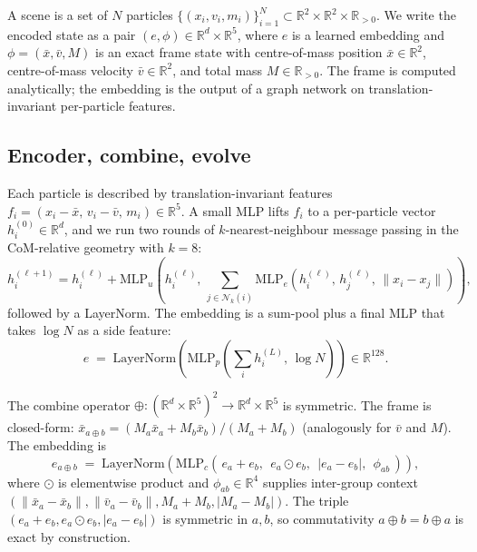 \documentclass[11pt]{article}
\newcommand{\R}{\mathbb{R}}
\newcommand{\combine}{\oplus}
\renewcommand{\frame}{\phi}
\begin{document}
A scene is a set of $N$ particles $\{(x_i, v_i, m_i)\}_{i=1}^{N} \subset \R^2 \times \R^2 \times \R_{>0}$. We write the encoded state as a pair $(e, \frame) \in \R^d \times \R^5$, where $e$ is a learned embedding and $\frame = (\bar{x}, \bar{v}, M)$ is an exact frame state with centre-of-mass position $\bar{x} \in \R^2$, centre-of-mass velocity $\bar{v} \in \R^2$, and total mass $M \in \R_{>0}$. The frame is computed analytically; the embedding is the output of a graph network on translation-invariant per-particle features.

\subsection{Encoder, combine, evolve}

Each particle is described by translation-invariant features $f_i = (x_i - \bar{x},\, v_i - \bar{v},\, m_i) \in \R^5$. A small MLP lifts $f_i$ to a per-particle vector $h_i^{(0)} \in \R^d$, and we run two rounds of $k$-nearest-neighbour message passing in the CoM-relative geometry with $k=8$:
\begin{equation}
  h_i^{(\ell+1)} = h_i^{(\ell)} + \mathrm{MLP}_u\!\left( h_i^{(\ell)},\, \sum_{j \in \mathcal{N}_k(i)} \mathrm{MLP}_e(h_i^{(\ell)},\, h_j^{(\ell)},\, \|x_i - x_j\|) \right),
\end{equation}
followed by a LayerNorm. The embedding is a sum-pool plus a final MLP that takes $\log N$ as a side feature:
\begin{equation}
  e \;=\; \mathrm{LayerNorm}\!\left(\mathrm{MLP}_p\!\left(\sum_i h_i^{(L)},\, \log N\right)\right) \in \R^{128}.
\end{equation}

The combine operator $\combine : (\R^d \times \R^5)^2 \to \R^d \times \R^5$ is symmetric. The frame is closed-form: $\bar{x}_{a \combine b} = (M_a \bar{x}_a + M_b \bar{x}_b)/(M_a + M_b)$ (analogously for $\bar{v}$ and $M$). The embedding is
\begin{equation}
  e_{a \combine b} \;=\; \mathrm{LayerNorm}\!\left(\mathrm{MLP}_c\!\left(\,e_a + e_b,\;\, e_a \odot e_b,\;\, |e_a - e_b|,\;\, \frame_{ab}\,\right)\right),
\end{equation}
where $\odot$ is elementwise product and $\frame_{ab} \in \R^4$ supplies inter-group context $(\|\bar{x}_a - \bar{x}_b\|, \|\bar{v}_a - \bar{v}_b\|, M_a + M_b, |M_a - M_b|)$. The triple $(e_a + e_b, e_a \odot e_b, |e_a - e_b|)$ is symmetric in $a, b$, so commutativity $a \combine b = b \combine a$ is exact by construction.
\end{document}
